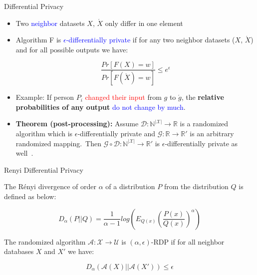 \documentclass{beamer}
\begin{document}
\begin{frame}{Differential Privacy}

\begin{itemize}
    \item Two \textcolor{blue}{neighbor} datasets $X$, $\acute{X}$ only differ in one element
    \item Algorithm F is \textcolor{blue}{$\epsilon$-differentially private} if for any two neighbor datasets ($X$, $\acute{X}$) and for all possible outputs we have: 
    
    \begin{equation*}
        \frac{Pr[F(X)=w]}{Pr[F(\acute{X})=w]}\leqslant e^{\epsilon}
    \end{equation*}
    
    \item Example: If person $P_i$ \textcolor{red}{changed their input} from $g$
    to $\acute{g}$, the \textbf{relative probabilities
    of any output} \textcolor{blue}{do not change by much}.
    \item \textbf{Theorem (post-processing):} Assume $\mathcal{D}:\mathbb{N}^{|\mathcal{X}|} \rightarrow \mathbb{R}$ is a randomized algorithm which is $\epsilon$-differentially private and $\mathcal{G}:\mathbb{R} \rightarrow \mathbb{R'}$ is an arbitrary randomized mapping.~Then $\mathcal{G} \circ \mathcal{D}:\mathbb{N}^{|\mathcal{X}|} \rightarrow \mathbb{R'}$ is $\epsilon$-differentially private as well~\cite{dwork2014algorithmic}.
    
\end{itemize}


\end{frame} 


\begin{frame}{Renyi Differential Privacy}

\begin{definition}\label{def:rd}

The Rényi divergence of order $\alpha$ of a distribution $P$ from the distribution $Q$ is defined as below:

$$D_\alpha(P||Q)=\frac{1}{\alpha - 1} log \left (E_{Q(x)}\left ( \frac{P(x)}{Q(x)} \right )^{\alpha}\right )$$ 

\end{definition}

\begin{definition}\label{def:rdp}

The randomized algorithm $\mathcal{A}: \mathcal{X} \rightarrow \mathcal{U}$ is $(\alpha,\epsilon)$-RDP if for all neighbor databases $X$ and ${X}'$ we have:

$$D_\alpha(\mathcal{A}(X)||\mathcal{A}({X}')) \leq \epsilon$$

\end{definition}


\end{frame} 
\end{document}
